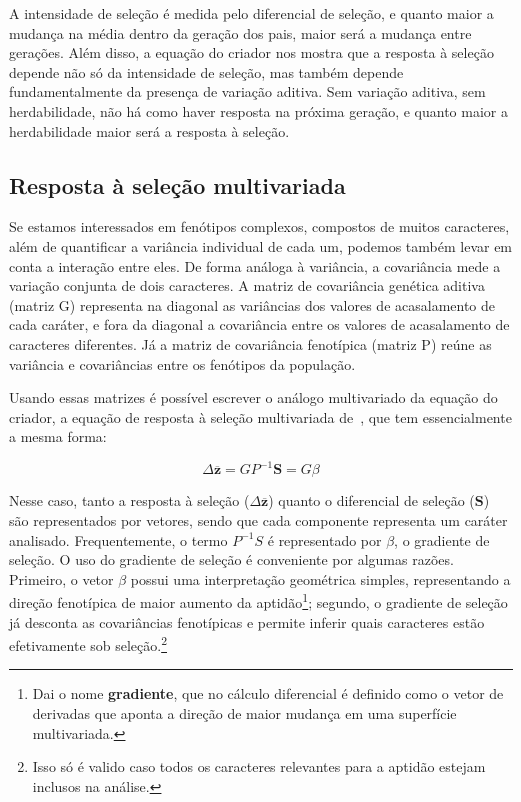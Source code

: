 \begin{refsection}
A intensidade de seleção é medida pelo diferencial de seleção, e quanto maior
a mudança na média dentro da geração dos pais, maior será a mudança entre gerações. Além
disso, a equação do criador nos mostra que a resposta à seleção depende não só
da intensidade de seleção, mas também depende fundamentalmente da presença de
variação aditiva. Sem variação aditiva, sem herdabilidade, não há como haver
resposta na próxima geração, e quanto maior a herdabilidade maior será a
resposta à seleção.

\subsection{Resposta à seleção multivariada}

Se estamos interessados em fenótipos complexos, compostos de muitos
caracteres, além de quantificar a variância individual de cada um, podemos
também levar em conta a interação entre eles. De forma análoga à variância, a
covariância mede a variação conjunta de dois caracteres. A matriz de
covariância genética aditiva (matriz G) representa na diagonal as variâncias
dos valores de acasalamento de cada caráter, e fora da diagonal a covariância
entre os valores de acasalamento de caracteres diferentes. Já a matriz de
covariância fenotípica (matriz P) reúne as variância e covariâncias entre os
fenótipos da população.

Usando essas matrizes é possível escrever o análogo multivariado da equação do
criador, a equação de resposta à seleção multivariada de~\textcite{Lande1979-by}, que
tem essencialmente a mesma forma:

\begin{equation}
\Delta \mathbf{\overline z} = GP^{-1}\mathbf{S} = G\beta
\end{equation}

Nesse caso, tanto a resposta à seleção ($\Delta \mathbf{\overline z}$) quanto
o diferencial de seleção ($\mathbf{S}$) são representados por vetores, sendo
que cada componente representa um caráter analisado. Frequentemente, o termo
$P^{-1}S$ é representado por $\beta$, o gradiente de seleção. O uso do
gradiente de seleção é conveniente por algumas razões. Primeiro, o vetor
$\beta$ possui uma interpretação geométrica simples, representando a direção
fenotípica de maior aumento da aptidão\footnote{Dai o nome \textbf{gradiente},
que no cálculo diferencial é definido como o vetor de derivadas que aponta a
direção de maior mudança em uma superfície multivariada.}; segundo, o
gradiente de seleção já desconta as covariâncias fenotípicas e permite inferir
quais caracteres estão efetivamente sob seleção.\footnote{Isso só é valido caso
todos os caracteres relevantes para a aptidão estejam inclusos na análise.}


\end{refsection}
